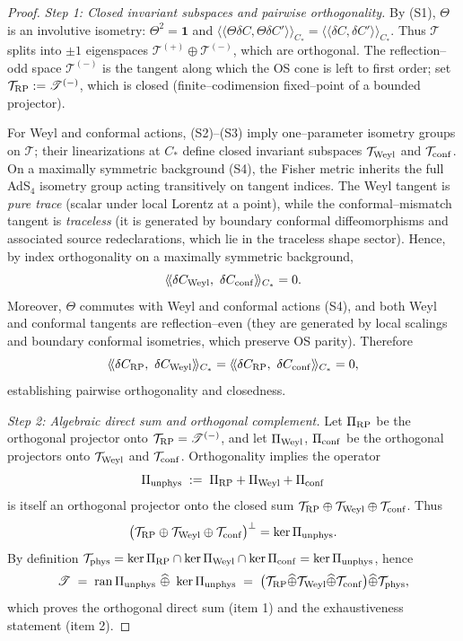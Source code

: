\documentclass[10pt]{article}
\theoremstyle{definition}
\theoremstyle{plain}
\begin{document}
\begin{proof}
\emph{Step 1: Closed invariant subspaces and pairwise orthogonality.}
By (S1), $\Theta$ is an involutive isometry: $\Theta^2=\mathbf 1$ and
$\langle\!\langle \Theta\delta C,\Theta\delta C'\rangle\!\rangle_{C_\ast}=\langle\!\langle \delta C,\delta C'\rangle\!\rangle_{C_\ast}$.
Thus $\mathscr T$ splits into $\pm 1$ eigenspaces $\mathscr T^{(+)}\oplus \mathscr T^{(-)}$,
which are orthogonal. The reflection–odd space $\mathscr T^{(-)}$ is the tangent along which the OS cone is left to first order; set $\mathcal T_{\rm RP}:=\mathscr T^{(-)}$, which is closed (finite–codimension fixed–point of a bounded projector).

For Weyl and conformal actions, (S2)–(S3) imply one–parameter isometry groups on $\mathscr T$; their linearizations at $C_\ast$ define closed invariant subspaces $\mathcal T_{\rm Weyl}$ and $\mathcal T_{\rm conf}$. On a maximally symmetric background (S4), the Fisher metric inherits the full AdS$_4$ isometry group acting transitively on tangent indices. The Weyl tangent is \emph{pure trace} (scalar under local Lorentz at a point), while the conformal–mismatch tangent is \emph{traceless} (it is generated by boundary conformal diffeomorphisms and associated source redeclarations, which lie in the traceless shape sector).
Hence, by index orthogonality on a maximally symmetric background,
\[
\langle\!\langle \delta C_{\rm Weyl},\ \delta C_{\rm conf}\rangle\!\rangle_{C_\ast}=0.
\]
Moreover, $\Theta$ commutes with Weyl and conformal actions (S4), and both Weyl and conformal tangents are reflection–even (they are generated by local scalings and boundary conformal isometries, which preserve OS parity). Therefore
\[
\langle\!\langle \delta C_{\rm RP},\ \delta C_{\rm Weyl}\rangle\!\rangle_{C_\ast}
=\langle\!\langle \delta C_{\rm RP},\ \delta C_{\rm conf}\rangle\!\rangle_{C_\ast}=0,
\]
establishing pairwise orthogonality and closedness.

\emph{Step 2: Algebraic direct sum and orthogonal complement.}
Let $\Pi_{\rm RP}$ be the orthogonal projector onto $\mathcal T_{\rm RP}=\mathscr T^{(-)}$,
and let $\Pi_{\rm Weyl}$, $\Pi_{\rm conf}$ be the orthogonal projectors onto $\mathcal T_{\rm Weyl}$ and $\mathcal T_{\rm conf}$. Orthogonality implies the operator
\[
\Pi_{\rm unphys}\;:=\;\Pi_{\rm RP}+\Pi_{\rm Weyl}+\Pi_{\rm conf}
\]
is itself an orthogonal projector onto the closed sum
$\mathcal T_{\rm RP}\oplus\mathcal T_{\rm Weyl}\oplus\mathcal T_{\rm conf}$.
Thus
\[
\big(\mathcal T_{\rm RP}\oplus\mathcal T_{\rm Weyl}\oplus\mathcal T_{\rm conf}\big)^\perp
=\ker \Pi_{\rm unphys}.
\]
By definition $\mathcal T_{\rm phys}=\ker\Pi_{\rm RP}\cap\ker\Pi_{\rm Weyl}\cap\ker\Pi_{\rm conf}
=\ker\Pi_{\rm unphys}$, hence
\[
\mathscr T\;=\;\mathrm{ran}\,\Pi_{\rm unphys}\ \widehat\oplus\ \ker\Pi_{\rm unphys}
\;=\;\big(\mathcal T_{\rm RP}\widehat\oplus \mathcal T_{\rm Weyl}\widehat\oplus \mathcal T_{\rm conf}\big)\widehat\oplus \mathcal T_{\rm phys},
\]
which proves the orthogonal direct sum (item 1) and the exhaustiveness statement (item 2).


\end{proof}
\end{document}

